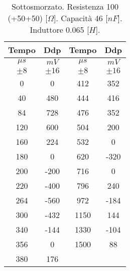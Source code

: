 \begin{table}[H]
\begin{center}
\begin{tabular}{|c|c|c|c|}
\hline
Tempo & Ddp & Tempo & Ddp \\ \hline
$\mu s$ & $mV$ & $\mu s$ & $mV$ \\ \hline
$\pm 8$ & $\pm 16$ & $\pm 8$ & $\pm 16$ \\ \hline
0 & 0 & 412 & 352 \\ \hline
40 & 480 & 444 & 416 \\ \hline
84 & 728 & 476 & 352 \\ \hline
120 & 600 & 504 & 200 \\ \hline
160 & 224 & 532 & 0 \\ \hline
180 & 0 & 620 & -320 \\ \hline
200 & -200 & 716 & 0 \\ \hline
220 & -400 & 796 & 240 \\ \hline
264 & -560 & 972 & -184 \\ \hline
300 & -432 & 1150 & 144 \\ \hline
340 & -144 & 1330 & -104 \\ \hline
356 & 0 & 1500 & 88 \\ \hline
380 & 176 &  &  \\ \hline
\end{tabular}
\end{center}
\caption{ Sottosmorzato.
Resistenza 100 (+50+50)  [$\Omega$].
Capacità  46    [$nF$].
Induttore 0.065 [$H$].
}
\label{tab:C4_P1_sotto}
\end{table}